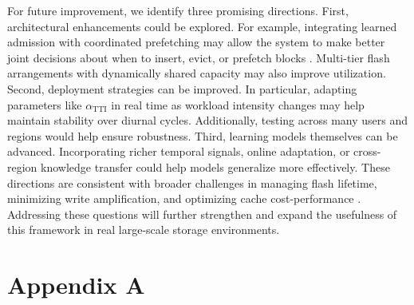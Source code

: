 \documentclass[sigconf]{acmart}
\begin{document}
For future improvement, we identify three promising directions. First, architectural enhancements could be explored. For example, integrating learned admission with coordinated prefetching may allow the system to make better joint decisions about when to insert, evict, or prefetch blocks \cite{wong2024baleen}. Multi-tier flash arrangements with dynamically shared capacity may also improve utilization. Second, deployment strategies can be improved. In particular, adapting parameters like $\alpha_{\text{TTI}}$ in real time as workload intensity changes may help maintain stability over diurnal cycles. Additionally, testing across many users and regions would help ensure robustness. Third, learning models themselves can be advanced. Incorporating richer temporal signals, online adaptation, or cross-region knowledge transfer could help models generalize more effectively. These directions are consistent with broader challenges in managing flash lifetime, minimizing write amplification, and optimizing cache cost-performance \cite{Yang2022CacheSack, Wang2020AustereCache, Oh2010CachingLess}. Addressing these questions will further strengthen and expand the usefulness of this framework in real large-scale storage environments.

\clearpage
\section{Appendix A}
\label{sec:appendix A}
\FloatBarrier
\end{document}
